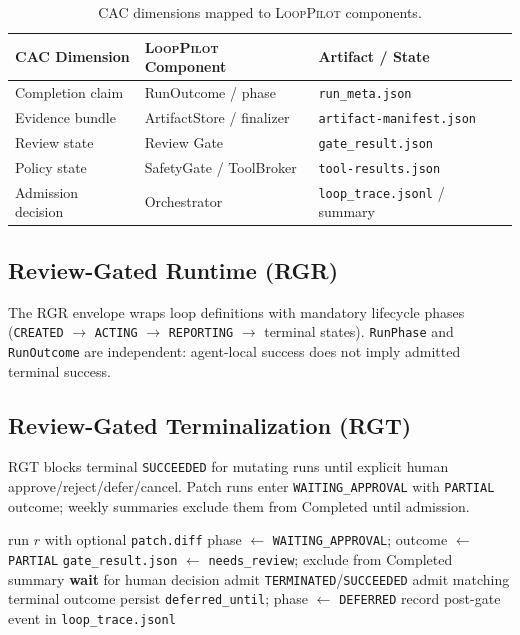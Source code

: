 \documentclass[11pt]{article}
\newcommand{\looppilot}{\textsc{LoopPilot}}
\newcommand{\cac}{\textsc{CAC}}
\newcommand{\rgr}{\textsc{RGR}}
\newcommand{\rgt}{\textsc{RGT}}
\begin{document}
\begin{table}[t]
  \centering
  \caption{\cac{} dimensions mapped to \looppilot{} components.}
  \label{tab:cac-mapping}
  \small
  \begin{tabular}{@{}lll@{}}
    \toprule
    \textbf{\cac{} Dimension} & \textbf{\looppilot{} Component} & \textbf{Artifact / State} \\
    \midrule
    Completion claim & RunOutcome / phase & \texttt{run\_meta.json} \\
    Evidence bundle & ArtifactStore / finalizer & \texttt{artifact-manifest.json} \\
    Review state & Review Gate & \texttt{gate\_result.json} \\
    Policy state & SafetyGate / ToolBroker & \texttt{tool-results.json} \\
    Admission decision & Orchestrator & \texttt{loop\_trace.jsonl} / summary \\
    \bottomrule
  \end{tabular}
\end{table}

\subsection{Review-Gated Runtime (\rgr{})}
The \rgr{} envelope wraps loop definitions with mandatory lifecycle phases (\texttt{CREATED} $\rightarrow$ \texttt{ACTING} $\rightarrow$ \texttt{REPORTING} $\rightarrow$ terminal states).
\texttt{RunPhase} and \texttt{RunOutcome} are independent: agent-local success does not imply admitted terminal success.

\subsection{Review-Gated Terminalization (\rgt{})}
\rgt{} blocks terminal \texttt{SUCCEEDED} for mutating runs until explicit human approve/reject/defer/cancel.
Patch runs enter \texttt{WAITING\_APPROVAL} with \texttt{PARTIAL} outcome; weekly summaries exclude them from Completed until admission.

\begin{algorithm}[t]
  \caption{Review-Gated Terminalization (admission hold)}
  \label{alg:rgt}
  \begin{algorithmic}[1]
    \REQUIRE run $r$ with optional \texttt{patch.diff}
      \STATE phase $\leftarrow$ \texttt{WAITING\_APPROVAL}; outcome $\leftarrow$ \texttt{PARTIAL}
      \STATE \texttt{gate\_result.json} $\leftarrow$ \texttt{needs\_review}; exclude from Completed summary
      \STATE \textbf{wait} for human decision
       \STATE admit \texttt{TERMINATED}/\texttt{SUCCEEDED}
       \STATE admit matching terminal outcome
       \STATE persist \texttt{deferred\_until}; phase $\leftarrow$ \texttt{DEFERRED}
      \ENDIF
    \ENDIF
    \STATE record post-gate event in \texttt{loop\_trace.jsonl}
  \end{algorithmic}
\end{algorithm}
\end{document}
